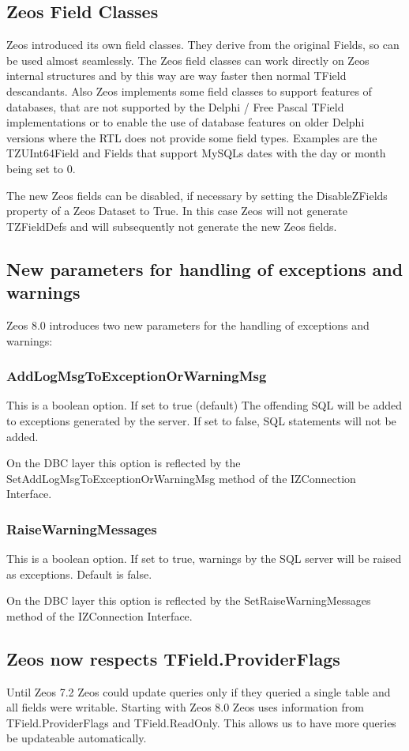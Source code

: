\documentclass[a4paper,12pt,oneside]{article}
\begin{document}
\subsection{Zeos Field Classes}
Zeos introduced its own field classes.
They derive from the original Fields, so can be used almost seamlessly.
The Zeos field classes can work directly on Zeos internal structures and by this way are way faster then normal TField descandants.
Also Zeos implements some field classes to support features of databases, that are not supported by the Delphi / Free Pascal TField implementations or to enable the use of database features on older Delphi versions where the RTL does not provide some field types.
Examples are the TZUInt64Field and Fields that support MySQLs dates with the day or month being set to 0.

The new Zeos fields can be disabled, if necessary by setting the DisableZFields property of a Zeos Dataset to True.
In this case Zeos will not generate TZFieldDefs and will subsequently not generate the new Zeos fields.

\subsection{New parameters for handling of exceptions and warnings}
Zeos 8.0 introduces two new parameters for the handling of exceptions and warnings:

\subsubsection{AddLogMsgToExceptionOrWarningMsg }
This is a boolean option.
If set to true (default) The offending SQL will be added to exceptions generated by the server.
If set to false, SQL statements will not be added.

On the DBC layer this option is reflected by the SetAddLogMsgToExceptionOrWarningMsg method of the IZConnection Interface.

\subsubsection{RaiseWarningMessages}
This is a boolean option.
If set to true, warnings by the SQL server will be raised as exceptions.
Default is false.

On the DBC layer this option is reflected by the SetRaiseWarningMessages method of the IZConnection Interface.

\subsection{Zeos now respects TField.ProviderFlags}
Until Zeos 7.2 Zeos could update queries only if they queried a single table and all fields were writable.
Starting with Zeos 8.0 Zeos uses information from TField.ProviderFlags and TField.ReadOnly.
This allows us to have more queries be updateable automatically.
\end{document}
